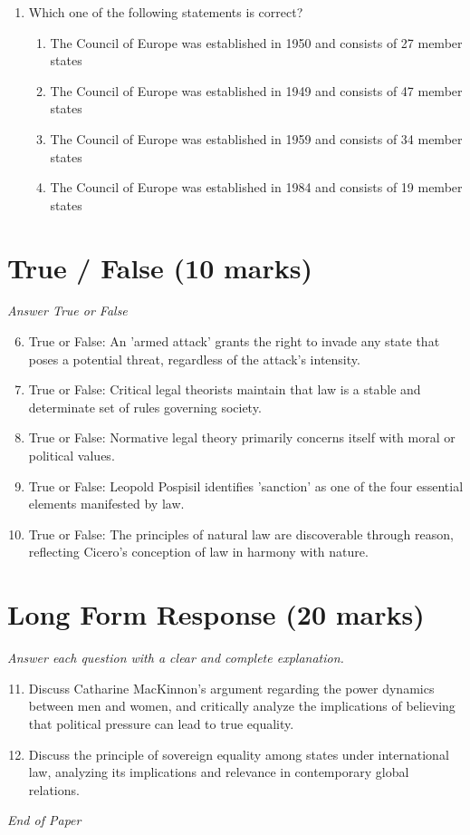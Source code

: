 \documentclass[12pt]{article}
\begin{document}
\begin{enumerate}[label=\arabic*.]
\begin{enumerate}[label=(\alph*)]
    \item Article 11
\end{enumerate}
\item Which one of the following statements is correct?
\begin{enumerate}[label=(\alph*)]
    \item The Council of Europe was established in 1950 and consists of 27 member states
    \item The Council of Europe was established in 1949 and consists of 47 member states
    \item The Council of Europe was established in 1959 and consists of 34 member states
    \item The Council of Europe was established in 1984 and consists of 19 member states
\end{enumerate}
\end{enumerate}

\section*{True / False (10 marks)}
\textit{Answer True or False}
\begin{enumerate}[label=\arabic*.]
\setcounter{enumi}{5}
\item True or False: An 'armed attack' grants the right to invade any state that poses a potential threat, regardless of the attack's intensity.
\item True or False: Critical legal theorists maintain that law is a stable and determinate set of rules governing society.
\item True or False: Normative legal theory primarily concerns itself with moral or political values.
\item True or False: Leopold Pospisil identifies 'sanction' as one of the four essential elements manifested by law.
\item True or False: The principles of natural law are discoverable through reason, reflecting Cicero's conception of law in harmony with nature.
\end{enumerate}

\section*{Long Form Response (20 marks)}
\textit{Answer each question with a clear and complete explanation.}
\begin{enumerate}[label=\arabic*.]
\setcounter{enumi}{10}
\item Discuss Catharine MacKinnon's argument regarding the power dynamics between men and women, and critically analyze the implications of believing that political pressure can lead to true equality.
\item Discuss the principle of sovereign equality among states under international law, analyzing its implications and relevance in contemporary global relations.
\end{enumerate}

\vfill
\noindent\textit{End of Paper}
\end{document}
